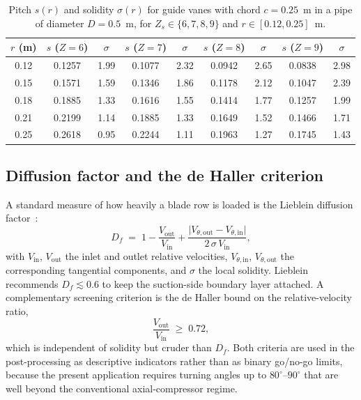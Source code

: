 \begin{table}[h!]
\centering
\caption[Pitch and solidity for selected vane counts]{Pitch $s(r)$ and solidity $\sigma(r)$ for guide vanes with chord $c = 0.25$~m in a pipe of diameter $D = 0.5$~m, for $Z_s \in \{6,7,8,9\}$ and $r \in [0.12, 0.25]$~m.}
\label{tab:pitch_solidity_design}
\small
\begin{tabular}{c|cc|cc|cc|cc}
\toprule
\textbf{$r$ (m)} & $s$ ($Z{=}6$) & $\sigma$ & $s$ ($Z{=}7$) & $\sigma$ & $s$ ($Z{=}8$) & $\sigma$ & $s$ ($Z{=}9$) & $\sigma$ \\
\midrule
0.12 & 0.1257 & 1.99 & 0.1077 & 2.32 & 0.0942 & 2.65 & 0.0838 & 2.98 \\
0.15 & 0.1571 & 1.59 & 0.1346 & 1.86 & 0.1178 & 2.12 & 0.1047 & 2.39 \\
0.18 & 0.1885 & 1.33 & 0.1616 & 1.55 & 0.1414 & 1.77 & 0.1257 & 1.99 \\
0.21 & 0.2199 & 1.14 & 0.1885 & 1.33 & 0.1649 & 1.52 & 0.1466 & 1.71 \\
0.25 & 0.2618 & 0.95 & 0.2244 & 1.11 & 0.1963 & 1.27 & 0.1745 & 1.43 \\
\bottomrule
\end{tabular}
\end{table}
 
\subsection{Diffusion factor and the de Haller criterion}
\label{sec:theory_diffusion}
 
A standard measure of how heavily a blade row is loaded is the Lieblein diffusion factor~\cite{Lieblein1953}:
\begin{equation}
D_f \;=\; 1 - \frac{V_{\mathrm{out}}}{V_{\mathrm{in}}}
       + \frac{\lvert V_{\theta,\mathrm{out}} - V_{\theta,\mathrm{in}} \rvert}
              {2\,\sigma\, V_{\mathrm{in}}},
\label{eq:Df}
\end{equation}
with $V_{\mathrm{in}}$, $V_{\mathrm{out}}$ the inlet and outlet relative velocities, $V_{\theta,\mathrm{in}}$, $V_{\theta,\mathrm{out}}$ the corresponding tangential components, and $\sigma$ the local solidity. Lieblein recommends $D_f \lesssim 0.6$ to keep the suction-side boundary layer attached. A complementary screening criterion is the de Haller bound on the relative-velocity ratio,
\begin{equation}
\frac{V_{\mathrm{out}}}{V_{\mathrm{in}}} \;\geq\; 0.72,
\label{eq:deHaller}
\end{equation}
which is independent of solidity but cruder than $D_f$. Both criteria are used in the post-processing as descriptive indicators rather than as binary go/no-go limits, because the present application requires turning angles up to $80^\circ$--$90^\circ$ that are well beyond the conventional axial-compressor regime.
 
